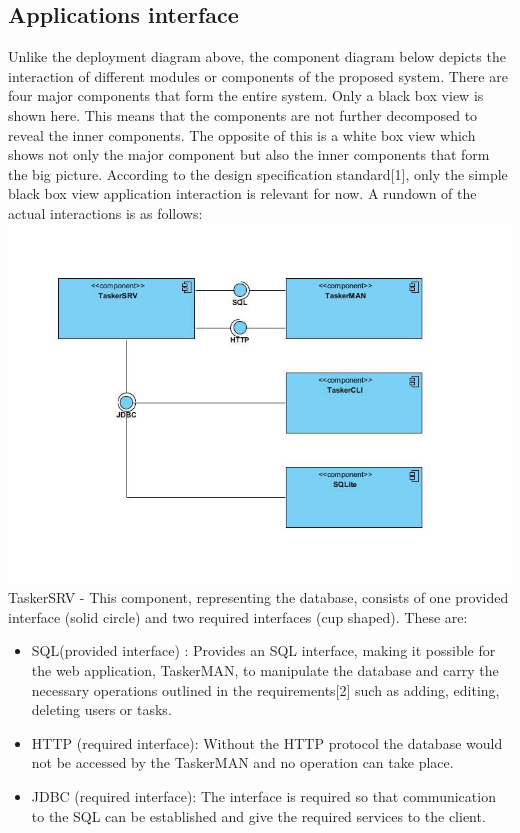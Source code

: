 \documentclass{project}
\begin{document}
\subsection{Applications interface}
Unlike the deployment diagram above, the component diagram below depicts the interaction of different modules or components of the proposed system. There are four major components that form the entire system. Only a black box view is shown here. This means that the components are not further decomposed to reveal the inner components. The opposite of this is a white box view which shows not only the major component but also the inner components that form the big picture. 
According to the design specification standard[1], only the simple black box view application interaction is relevant for now. A rundown of the actual interactions is as follows: \\
\includegraphics[width=\textwidth]{images/4.2/ApplicationsInterface} 
TaskerSRV - This component, representing the database, consists of one provided interface (solid circle) and two required interfaces (cup shaped). These are:
\begin{itemize}
	\item SQL(provided interface) : Provides an SQL interface, making it possible for the web application, TaskerMAN, to manipulate the database and carry the necessary operations outlined in the requirements[2] such as adding, editing, deleting users or tasks. 
	\item HTTP (required interface): Without the HTTP protocol the database would not be accessed by the TaskerMAN and no operation can take place.
	\item JDBC (required interface): The interface is required so that communication to the SQL can be established and give the required services to the client.
\end{itemize}
\end{document}
